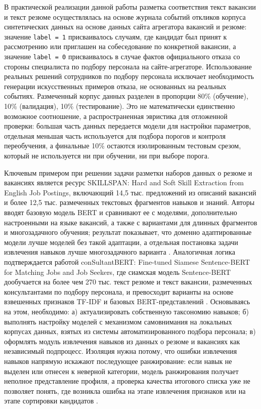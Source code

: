 В практической реализации данной работы разметка соответствия текст вакансии и текст резюме осуществлялась на основе журнала событий откликов корпуса синтетических данных на основе данных сайта агрегатора вакансий и резюме: значение \texttt{label = 1} присваивалось случаям, где кандидат был принят к рассмотрению или приглашен на собеседование по конкретной вакансии, а значение \texttt{label = 0} присваивалось в случае фактов официального отказа со стороны специалиста по подбору персонала на сайте-агрегаторе. Использование реальных решений сотрудников по подбору персонала исключает необходимость генерации искусственных примеров отказа, не основанных на реальных событиях. Размеченный корпус данных разделен в пропорции 80\% (обучение), 10\% (валидация), 10\% (тестирование). Это не математически единственно возможное соотношение, а распространенная эвристика для отложенной проверки: большая часть данных передается модели для настройки параметров, отдельная меньшая часть используется для подбора порогов и контроля переобучения, а финальные 10\% остаются изолированным тестовым срезом, который не используется ни при обучении, ни при выборе порога.

Ключевым примером при решении задачи разметки наборов данных о резюме и вакансиях является ресурс SKILLSPAN: Hard and Soft Skill Extraction from English Job Postings, включающий 14,5 тыс. предложений из описаний вакансий и более 12,5 тыс. размеченных текстовых фрагментов навыков и знаний. Авторы вводят базовую модель BERT и сравнивают ее с моделями, дополнительно настроенными на языке вакансий, а также с вариантами для длинных фрагментов и многозадачного обучения; результат показывает, что доменно адаптированные модели лучше моделей без такой адаптации, а отдельная постановка задачи извлечения навыков лучше многозадачного варианта \cite{src24}. Аналогичная логика подтверждается работой conSultantBERT: Fine-tuned Siamese Sentence-BERT for Matching Jobs and Job Seekers, где сиамская модель Sentence-BERT дообучается на более чем 270 тыс. текст резюме и текст вакансии, размеченных консультантами по подбору персонала, и превосходит варианты на основе взвешенных признаков TF-IDF и базовых BERT-представлений \cite{src39}. Основываясь на этом, необходимо: а) актуализировать собственную таксономию навыков; б) выполнять настройку моделей с механизмом самовнимания на локальных корпусах данных, взятых из системы автоматизированного подбора персонала; в) оформлять модуль извлечения навыков из данных о резюме и вакансиях как независимый подпроцесс. Изоляция нужна потому, что ошибки извлечения навыков напрямую искажают последующее ранжирование: если навык не выделен или отнесен к неверной категории, модель ранжирования получает неполное представление профиля, а проверка качества итогового списка уже не позволяет понять, где возникла ошибка на этапе извлечения признаков или на этапе сортировки кандидатов \cite{src18, src24}.

